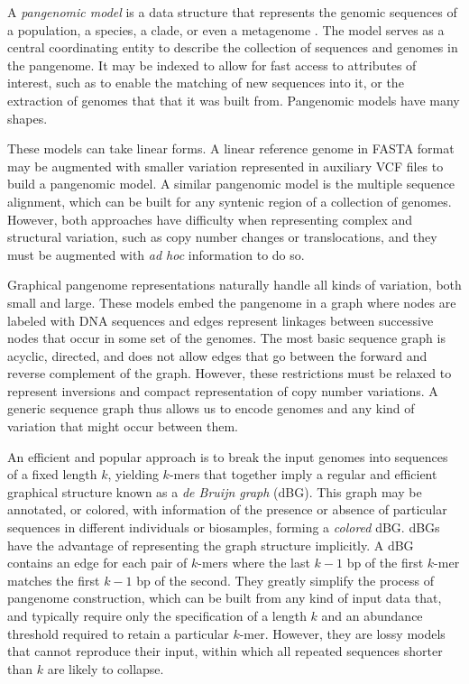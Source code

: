 A \emph{pangenomic model} is a data structure that represents the genomic sequences of a population, a species, a clade, or even a metagenome \cite{computational2016computational}.
The model serves as a central coordinating entity to describe the collection of sequences and genomes in the pangenome.
It may be indexed to allow for fast access to attributes of interest, such as to enable the matching of new sequences into it, or the extraction of genomes that that it was built from.
Pangenomic models have many shapes.

These models can take linear forms.
A linear reference genome in FASTA format may be augmented with smaller variation represented in auxiliary VCF files to build a pangenomic model.
A similar pangenomic model is the multiple sequence alignment, which can be built for any syntenic region of a collection of genomes.
However, both approaches have difficulty when representing complex and structural variation, such as copy number changes or translocations, and they must be augmented with \textit{ad hoc} information to do so.

Graphical pangenome representations naturally handle all kinds of variation, both small and large.
These models embed the pangenome in a graph where nodes are labeled with DNA sequences and edges represent linkages between successive nodes that occur in some set of the genomes.
The most basic sequence graph is acyclic, directed, and does not allow edges that go between the forward and reverse complement of the graph.
However, these restrictions must be relaxed to represent inversions and compact representation of copy number variations.
A generic sequence graph thus allows us to encode genomes and any kind of variation that might occur between them.

An efficient and popular approach is to break the input genomes into sequences of a fixed length $k$, yielding $k$-mers that together imply a regular and efficient graphical structure known as a \emph{de Bruijn graph} (dBG).
This graph may be annotated, or colored, with information of the presence or absence of particular sequences in different individuals or biosamples, forming a \emph{colored} dBG.
dBGs have the advantage of representing the graph structure implicitly.
A dBG contains an edge for each pair of $k$-mers where the last $k-1$ bp of the first $k$-mer matches the first $k-1$ bp of the second.
They greatly simplify the process of pangenome construction, which can be built from any kind of input data that, and typically require only the specification of a length $k$ and an abundance threshold required to retain a particular $k$-mer.
However, they are lossy models that cannot reproduce their input, within which all repeated sequences shorter than $k$ are likely to collapse.


